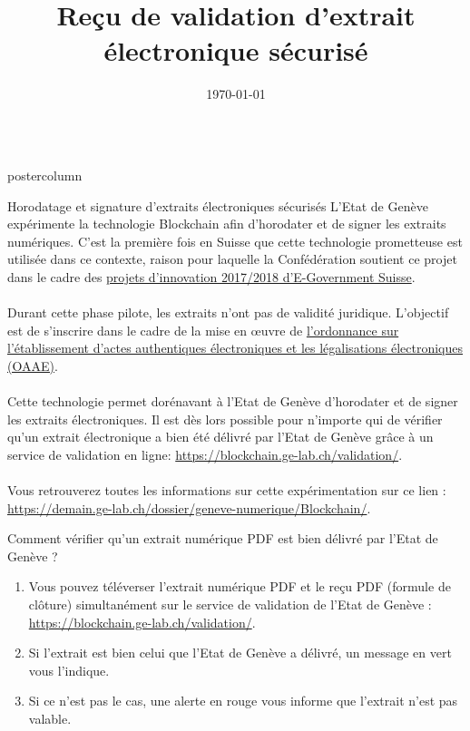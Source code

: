 \documentclass[roundedcorners=true, titleposition=center]{beamerthemeruhuisstijlposter}
\title{Reçu de validation d’extrait électronique sécurisé}
\date{\today}
\begin{document}
\begin{frame}
\begin{columns}
\begin{column}{0.95\textwidth}
\begin{beamercolorbox}[center, wd=\textwidth]{postercolumn}
\begin{minipage}[T]{0.95\textwidth}
\parbox[t][\columnheight]{\textwidth}{%
\begin{block}{Horodatage et signature d'extraits électroniques sécurisés}
L'Etat de Genève expérimente la technologie Blockchain afin d'horodater et de signer les extraits numériques. C'est la première fois en Suisse que cette technologie prometteuse est utilisée dans ce contexte, raison pour laquelle la Confédération soutient ce projet dans le cadre des \href{https://www.egovernment.ch/fr/umsetzung/innovationen/innovations-20172018/}{projets d'innovation 2017/2018 d'E-Government Suisse}.
\\
\\
Durant cette phase pilote, les extraits n'ont pas de validité juridique. L'objectif est de s'inscrire dans le cadre de la mise en œuvre de \href{https://www.ejpd.admin.ch/ejpd/fr/home/aktuell/news/2016/2016-09-07.html}{l'ordonnance sur l'établissement d'actes authentiques électroniques et les légalisations électroniques (OAAE)}.
\\
\\
Cette technologie permet dorénavant à l'Etat de Genève d'horodater et de signer les extraits électroniques. Il est dès lors possible pour n'importe qui de vérifier qu'un extrait électronique a bien été délivré par l'Etat de Genève grâce à un service de validation en ligne: \href{https://blockchain.ge-lab.ch/validation/}{https://blockchain.ge-lab.ch/validation/}.
\\
\\
Vous retrouverez toutes les informations sur cette expérimentation sur ce lien : \href{https://demain.ge-lab.ch/dossier/geneve-numerique/Blockchain/}{https://demain.ge-lab.ch/dossier/geneve-numerique/Blockchain/}.
\end{block}
\medskip
\begin{block}{Comment vérifier qu'un extrait numérique PDF est bien délivré par l'Etat de Genève ?}
\begin{enumerate}
\item Vous pouvez téléverser l'extrait numérique PDF et le reçu PDF (formule de clôture) simultanément sur le service de validation de l'Etat de Genève : \href{https://blockchain.ge-lab.ch/validation/}{https://blockchain.ge-lab.ch/validation/}.
\item Si l'extrait est bien celui que l'Etat de Genève a délivré, un message en vert vous l'indique.
\item Si ce n'est pas le cas, une alerte en rouge vous informe que l'extrait n'est pas valable.
\end{enumerate}
\end{block}
}
\end{minipage}
\end{beamercolorbox}
\end{column}
\end{columns}
\end{frame}
\end{document}
